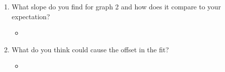 \documentclass{article}
\begin{document}
\begin{center}
  \begin{enumerate}
    \item What slope do you find for graph 2 and how does it compare to your expectation?
    \begin{itemize}
      \item
    \end{itemize}
    \item What do you think could cause the offset in the fit?
    \begin{itemize}
      \item
    \end{itemize}
  \end{enumerate}
\end{center}
\end{document}
